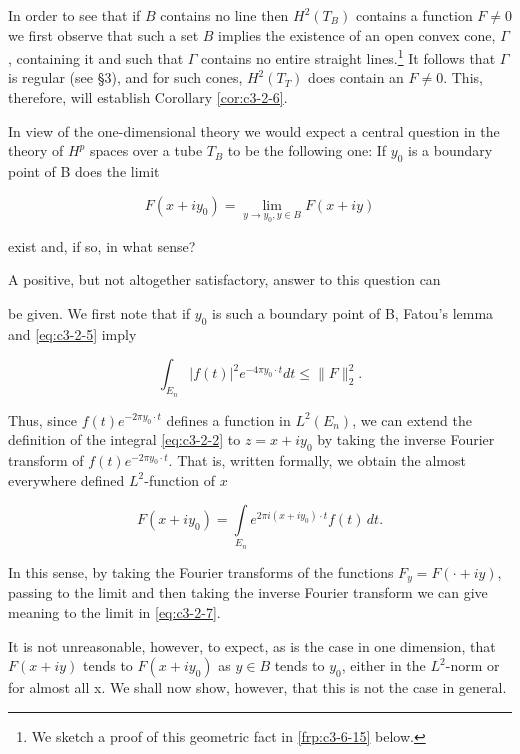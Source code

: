 In order to see that if $B$ contains no line then $H^2(T_B)$ contains a function $F \neq 0$ we first observe that such a set $B$ implies the existence of an open convex cone, $\Gamma$, containing it and such that $\Gamma$ contains no entire straight lines.\footnote{We sketch a proof of this geometric fact in \eqref{frp:c3-6-15} below.} It follows that $\Gamma$ is regular (see §3), and for such cones, $H^2(T_T)$ does contain an $F \neq 0$. This, therefore, will establish Corollary \ref{cor:c3-2-6}.

In view of the one-dimensional theory we would expect a central question in the theory of $H^{p}$ spaces over a tube $T_{B}$ to be the following one: If $y_{0}$ is a boundary point of B does the limit

\begin{equation}\label{eq:c3-2-7}
F(x+iy_{0})=\lim\limits_{y\to y_{0},y\in B}F(x+iy)
\end{equation}

exist and, if so, in what sense?

A positive, but not altogether satisfactory, answer to this question can

be given. We first note that if $y_{0}$ is such a boundary point of B, Fatou's lemma and \eqref{eq:c3-2-5} imply

\[
\int_{E_{n}}|f(t)|^{2}e^{-4\pi y_{0}\cdot t}dt\leq\|F\|_{2}^{2}.
\]

Thus, since $f(t)e^{-2\pi y_0\cdot t}$ defines a function in $L^2(E_n)$, we can extend the definition of the integral \eqref{eq:c3-2-2} to $z = x + iy_0$ by taking the inverse Fourier transform of $f(t)e^{-2\pi y_0\cdot t}$. That is, written formally, we obtain the almost everywhere defined $L^2$-function of $x$

\begin{equation}\label{eq:c3-2-8}
F(x+i y_{0})=\int\limits_{E_{n}}e^{2\pi i(x+i y_{0})\cdot t}f(t)\,dt.
\end{equation}

In this sense, by taking the Fourier transforms of the functions $F_y = F(\cdot + iy)$, passing to the limit and then taking the inverse Fourier transform we can give meaning to the limit in \eqref{eq:c3-2-7}.

It is not unreasonable, however, to expect, as is the case in one dimension, that $F(x + iy)$ tends to $F(x + iy_0)$ as $y \in B$ tends to $y_0$, either in the $L^2$-norm or for almost all x. We shall now show, however, that this is not the case in general.

